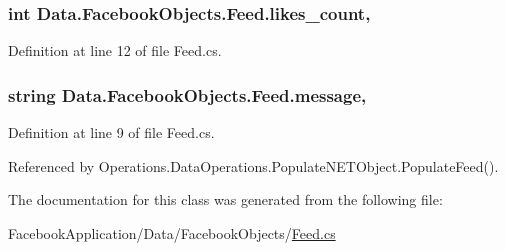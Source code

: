 \subsubsection[{\texorpdfstring{likes\+\_\+count}{likes_count}}]{\setlength{\rightskip}{0pt plus 5cm}int Data.\+Facebook\+Objects.\+Feed.\+likes\+\_\+count\hspace{0.3cm}{\ttfamily [get]}, {\ttfamily [set]}}\hypertarget{class_data_1_1_facebook_objects_1_1_feed_aa3afa5771c16a58cc9083d85647dfb18}{}\label{class_data_1_1_facebook_objects_1_1_feed_aa3afa5771c16a58cc9083d85647dfb18}


Definition at line 12 of file Feed.\+cs.

\subsubsection[{\texorpdfstring{message}{message}}]{\setlength{\rightskip}{0pt plus 5cm}string Data.\+Facebook\+Objects.\+Feed.\+message\hspace{0.3cm}{\ttfamily [get]}, {\ttfamily [set]}}\hypertarget{class_data_1_1_facebook_objects_1_1_feed_a7f3204b98bbca6326617144ed65cd035}{}\label{class_data_1_1_facebook_objects_1_1_feed_a7f3204b98bbca6326617144ed65cd035}


Definition at line 9 of file Feed.\+cs.



Referenced by Operations.\+Data\+Operations.\+Populate\+N\+E\+T\+Object.\+Populate\+Feed().



The documentation for this class was generated from the following file\+:\begin{DoxyCompactItemize}
\item 
Facebook\+Application/\+Data/\+Facebook\+Objects/\hyperlink{_feed_8cs}{Feed.\+cs}\end{DoxyCompactItemize}
